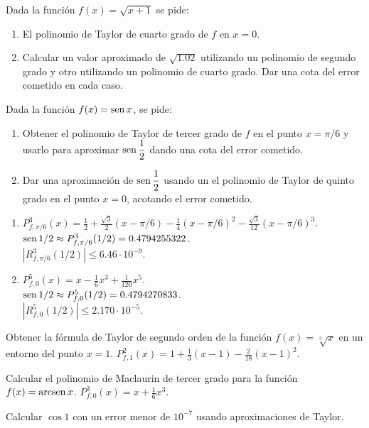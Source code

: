 
{Dada la función $f(x)=\sqrt{x+1}$ se pide:
\begin{enumerate}
\item  El polinomio de Taylor de cuarto grado de $f$ en $x=0$.
\item  Calcular un valor aproximado de $\sqrt{1.02}$ utilizando un polinomio de segundo grado y otro utilizando un polinomio de cuarto grado. Dar una cota del error cometido en cada caso.
\end{enumerate}
}


{Dada la función $f(x)=\operatorname{sen} x$, se pide:
\begin{enumerate}
\item  Obtener el polinomio de Taylor de tercer grado de $f$ en el punto $x=\pi/6$ y usarlo para aproximar $\operatorname{sen}\dfrac{1}{2}$ dando una cota del error cometido.
\item  Dar una aproximación de $\operatorname{sen}\dfrac{1}{2}$ usando un el polinomio de Taylor de quinto grado en el punto $x=0$, acotando el error cometido.
\end{enumerate}
}
{
\begin{enumerate}
\item $P^3_{f,\pi/6}(x) = \frac{1}{2}+\frac{\sqrt{3}}{2}(x-\pi/6)-\frac{1}{4}(x-\pi/6)^2-\frac{\sqrt{3}}{12}(x-\pi/6)^3$.\\
$\operatorname{sen} 1/2 \approx P^3_{f,\pi/6}(1/2) = 0.4794255322$.\\
$|R^3_{f,\pi/6}(1/2)|\leq 6.46\cdot 10^{-9}$.
\item $P^5_{f,0}(x) = x -\frac{1}{6} x^3 + \frac{1}{120}x^5$.\\
$\operatorname{sen} 1/2 \approx P^5_{f,0}(1/2) = 0.4794270833$.\\
$|R^5_{f,0}(1/2)|\leq 2.170\cdot 10^{-5}$.
\end{enumerate}
}
{
}


{Obtener la fórmula de Taylor de segundo orden de la función $f(x)=\sqrt[3]{x}$ en un entorno del punto $x=1$.
}
{$P^2_{f,1}(x) = 1+\frac{1}{3}(x-1)-\frac{2}{18}(x-1)^2$.
}
{
}


{Calcular el polinomio de Maclaurin de tercer grado para la función $f(x)=\operatorname{arcsen} x$.
}
{$P^3_{f,0}(x) = x+\frac{1}{6}x^3$.
}
{
}


{Calcular $\cos 1$ con un error menor de $10^{-7}$ usando aproximaciones de Taylor.
}


